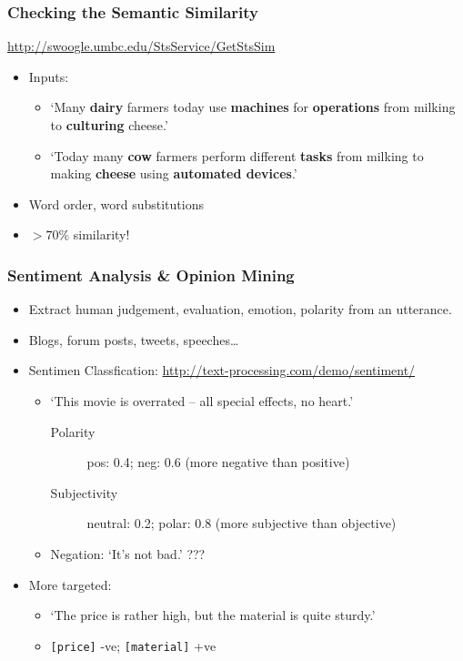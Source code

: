 \begin{frame}
\frametitle{Checking the Semantic Similarity}

\url{http://swoogle.umbc.edu/StsService/GetStsSim}

\begin{itemize}
\item Inputs:
	\begin{itemize}
		\item `Many \textbf<2->{dairy} farmers today use \textbf<2->{machines} for \textbf<2->{operations} from milking to \textbf<2->{culturing} cheese.'
		\item `Today many \textbf<2->{cow} farmers perform different \textbf<2->{tasks} from milking to making \textbf<2->{cheese} using \textbf<2->{automated devices}.' 
	\end{itemize}
\item<3-> Word order, word substitutions
\item<4-> $ > 70\%$ similarity!
\end{itemize}

\end{frame}


\begin{frame}
\frametitle{Sentiment Analysis \& Opinion Mining}

\begin{itemize}
\item<1> Extract human judgement, evaluation, emotion, polarity from an utterance.
\item<1> Blogs, forum posts, tweets, speeches\ldots
\item<2> Sentimen Classfication: \url{http://text-processing.com/demo/sentiment/}
	\begin{itemize}
	\item `This movie is overrated -- all special effects, no heart.' 
		\begin{description}
			\item[Polarity] pos: 0.4; neg: 0.6 (more negative than positive)
			\item[Subjectivity] neutral: 0.2; polar: 0.8 (more subjective than objective) 
		\end{description}
	\item Negation: `It's not bad.' ???
	\end{itemize}
\item<3> More targeted:
	\begin{itemize}
	\item `The price is rather high, but the material is quite sturdy.'
	\item \texttt{[price]} -ve; \texttt{[material]} +ve
	\end{itemize}
\end{itemize}

\end{frame}

